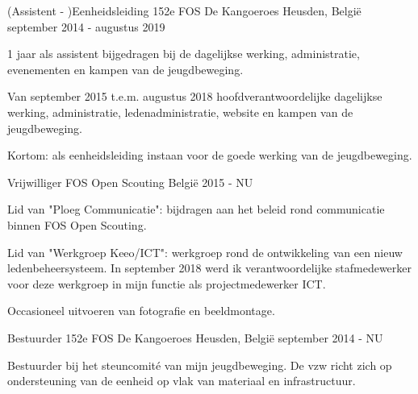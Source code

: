 


\begin{cventries}


\cventry
{(Assistent - )Eenheidsleiding} %
{152e FOS De Kangoeroes} %
{Heusden, België} %
{september 2014 - augustus 2019} %
{ %
\begin{cvitems}
\item {1 jaar als assistent bijgedragen bij de dagelijkse werking, administratie, evenementen en kampen van de jeugdbeweging.}
\item {Van  september 2015 t.e.m. augustus 2018 hoofdverantwoordelijke dagelijkse werking, administratie, ledenadministratie, website en kampen van de jeugdbeweging.}
\item {Kortom: als eenheidsleiding instaan voor de goede werking van de jeugdbeweging.}
\end{cvitems}
}

\cventry
{Vrijwilliger} %
{FOS Open Scouting} %
{België} %
{2015 - NU} %
{ %
	\begin{cvitems}
		\item {Lid van "Ploeg Communicatie": bijdragen aan het beleid rond communicatie binnen FOS Open Scouting.}
		\item {Lid van "Werkgroep Keeo/ICT": werkgroep rond de ontwikkeling van een nieuw ledenbeheersysteem. In september 2018 werd ik verantwoordelijke stafmedewerker voor deze werkgroep in mijn functie als projectmedewerker ICT.}
		\item {Occasioneel uitvoeren van fotografie en beeldmontage.}		
	\end{cvitems}
}

\cventry
{Bestuurder}
{152e FOS De Kangoeroes}
{Heusden, België}
{september 2014 - NU}
{
	\begin{cvitems}
		\item {Bestuurder bij het steuncomité van mijn jeugdbeweging. De vzw richt zich op ondersteuning van de eenheid op vlak van materiaal en infrastructuur.}
	\end{cvitems}
}







\end{cventries}